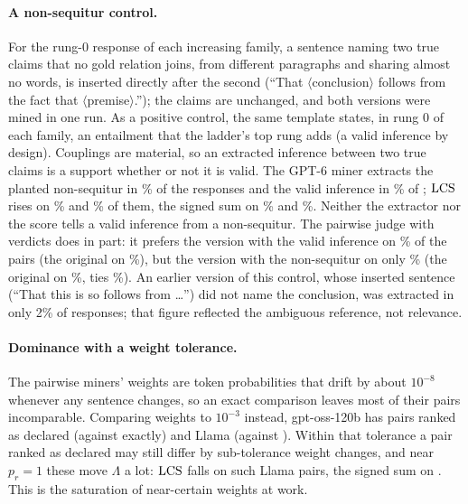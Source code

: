 \paragraph{A non-sequitur control.} For the rung-0 response of each increasing family, a sentence
naming two true claims that no gold relation joins, from different paragraphs and sharing almost no
words, is inserted directly after the second (``That $\langle$conclusion$\rangle$ follows from the
fact that $\langle$premise$\rangle$.''); the claims are unchanged, and both versions were mined in one
run. As a positive control, the same template states, in rung 0 of each  family, an
entailment that the ladder's top rung adds (a valid inference by design). Couplings are material,
so an extracted inference between two true claims is a support whether or not it is valid. The GPT-6
miner extracts the planted non-sequitur in \nsExtracted\% of the \nsPairs{} responses and the valid
inference in \nvExtracted\% of \nvPairs; $\mathrm{LCS}$ rises on \nsLcsRise\% and \nvLcsRise\% of them, the
signed sum on \nsWsumRise\% and \nvWsumRise\%. Neither the extractor nor the score tells a valid
inference from a non-sequitur. The pairwise judge with verdicts does in part: it prefers the version
with the valid inference on \nvJudgeEdited\% of the pairs (the original on \nvJudgeOrig\%), but the
version with the non-sequitur on only \nsJudgeEdited\% (the original on \nsJudgeOrig\%, ties
\nsJudgeTie\%). An earlier version of this control, whose inserted sentence (``That this is so
follows from \ldots'') did not name the conclusion, was extracted in only 2\% of responses; that
figure reflected the ambiguous reference, not relevance.

\paragraph{Dominance with a weight tolerance.} The pairwise miners' weights are token probabilities
that drift by about $10^{-8}$ whenever any sentence changes, so an exact comparison leaves most of
their pairs incomparable. Comparing weights to $10^{-3}$ instead, gpt-oss-120b has
\sThreePairOssDomTForward{} pairs ranked as declared (against \sThreePairOssDomForward{} exactly) and
Llama \sThreePairLlamaDomTForward{} (against \sThreePairLlamaDomForward). Within that tolerance a
pair ranked as declared may still differ by sub-tolerance weight changes, and near $p_r=1$ these move
$\Lambda$ a lot: $\mathrm{LCS}$ falls on \sThreePairLlamaDomTForwardFalls{} such Llama pairs, the signed sum on
\sThreePairLlamaDomTWForwardFalls. This is the saturation of near-certain weights at work.

